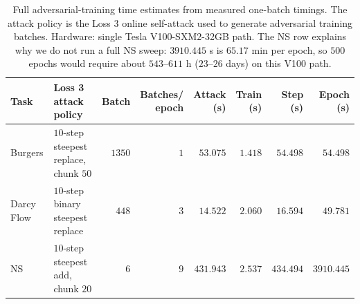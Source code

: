 \begin{table}[t]
\centering
\footnotesize
\caption{Full adversarial-training time estimates from measured
one-batch timings. The attack policy is the Loss 3 online self-attack used to
generate adversarial training batches. Hardware: single Tesla V100-SXM2-32GB path.
The NS row explains why we do not run a full NS sweep: $3910.445$ s is
$65.17$ min per epoch, so $500$ epochs would require about $543$--$611$ h
($23$--$26$ days) on this V100 path.}
\label{tab:adv_training_epoch_timing}
\setlength{\tabcolsep}{1.5pt}
\begin{tabularx}{\textwidth}{@{}lXrrrrrr@{}}
\toprule
Task & Loss 3 attack policy & Batch & \shortstack{Batches/\\epoch} &
\shortstack{Attack\\(s)} & \shortstack{Train\\(s)} &
\shortstack{Step\\(s)} & \shortstack{Epoch\\(s)} \\
\midrule
Burgers & $10$-step steepest replace, chunk $50$ & $1350$ & $1$ & $53.075$ & $1.418$ & $54.498$ & $54.498$ \\
Darcy Flow & $10$-step binary steepest replace & $448$ & $3$ & $14.522$ & $2.060$ & $16.594$ & $49.781$ \\
NS & $10$-step steepest add, chunk $20$ & $6$ & $9$ & $431.943$ & $2.537$ & $434.494$ & $3910.445$ \\
\bottomrule
\end{tabularx}
\end{table}

